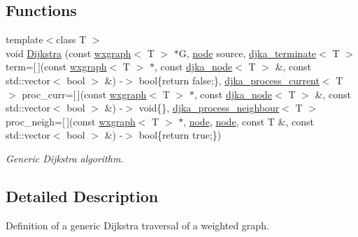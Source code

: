 \subsection*{Functions}
\begin{DoxyCompactItemize}
\item 
{\footnotesize template$<$class T $>$ }\\void \hyperlink{namespacelgraph_1_1traversal_1_1dijkstra_ac6a10a950b1355d5a2c4d3a369be3e27}{Dijkstra} (const \hyperlink{classlgraph_1_1wxgraph}{wxgraph}$<$ T $>$ $\ast$G, \hyperlink{namespacelgraph_a397169dd66adf725210a30fb7251773e}{node} source, \hyperlink{namespacelgraph_1_1traversal_1_1dijkstra_ac9bfbfba77a9969151df891b207d078c}{djka\-\_\-terminate}$<$ T $>$ term=\mbox{[}$\,$\mbox{]}(const \hyperlink{classlgraph_1_1wxgraph}{wxgraph}$<$ T $>$ $\ast$, const \hyperlink{namespacelgraph_1_1traversal_1_1dijkstra_ab54520d6f8049c8841128742624904a3}{djka\-\_\-node}$<$ T $>$ \&, const std\-::vector$<$ bool $>$ \&) -\/$>$ bool\{return false;\}, \hyperlink{namespacelgraph_1_1traversal_1_1dijkstra_a6fd2792dd3d21438c17adc0187e99f66}{djka\-\_\-process\-\_\-current}$<$ T $>$ proc\-\_\-curr=\mbox{[}$\,$\mbox{]}(const \hyperlink{classlgraph_1_1wxgraph}{wxgraph}$<$ T $>$ $\ast$, const \hyperlink{namespacelgraph_1_1traversal_1_1dijkstra_ab54520d6f8049c8841128742624904a3}{djka\-\_\-node}$<$ T $>$ \&, const std\-::vector$<$ bool $>$ \&) -\/$>$ void\{\}, \hyperlink{namespacelgraph_1_1traversal_1_1dijkstra_a5e5d24edba3465d838a24b322a9d2a56}{djka\-\_\-process\-\_\-neighbour}$<$ T $>$ proc\-\_\-neigh=\mbox{[}$\,$\mbox{]}(const \hyperlink{classlgraph_1_1wxgraph}{wxgraph}$<$ T $>$ $\ast$, \hyperlink{namespacelgraph_a397169dd66adf725210a30fb7251773e}{node}, \hyperlink{namespacelgraph_a397169dd66adf725210a30fb7251773e}{node}, const T \&, const std\-::vector$<$ bool $>$ \&) -\/$>$ bool\{return true;\})
\begin{DoxyCompactList}\small\item\em Generic Dijkstra algorithm. \end{DoxyCompactList}\end{DoxyCompactItemize}


\subsection{Detailed Description}
Definition of a generic Dijkstra traversal of a weighted graph. 

